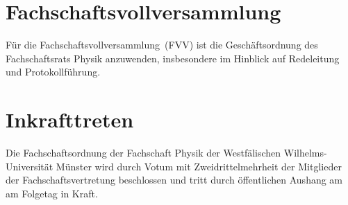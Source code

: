 \section{Fachschaftsvollversammlung}
Für die Fachschaftsvollversammlung~(FVV) ist die Geschäftsordnung des Fachschaftsrats Physik anzuwenden, insbesondere im Hinblick auf Redeleitung und Protokollführung.

\section{Inkrafttreten}
Die Fachschaftsordnung der Fachschaft Physik der Westfälischen Wilhelms-Universität Münster wird durch Votum mit Zweidrittelmehrheit der Mitglieder der Fachschaftsvertretung beschlossen und tritt durch öffentlichen Aushang am  am Folgetag in Kraft.


